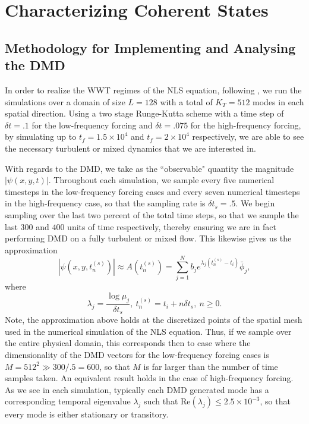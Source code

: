 \documentclass[aps,prl,preprint,groupedaddress]{revtex4-1}
\begin{document}
\section*{Characterizing Coherent States}

\subsection*{Methodology for Implementing and Analysing the DMD}

In order to realize the WWT regimes of the NLS equation, following \cite{nazarenko2}, we run the simulations over a domain of size $L=128$ with a total of $K_{T}=512$ modes in each spatial direction.  Using a two stage Runge-Kutta scheme with a time step of $\delta t=.1$ for the low-frequency forcing and $\delta t=.075$ for the high-frequency forcing, by simulating up to $t_{f}=1.5\times 10^{4}$ and $t_{f}=2\times 10^{4}$ respectively, we are able to see the necessary turbulent or mixed dynamics that we are interested in.  

With regards to the DMD, we take as the ``observable" quantity the magnitude $|\psi(x,y,t)|$.  Throughout each simulation, we sample every five numerical timesteps in the low-frequency forcing cases and every seven numerical timesteps in the high-frequency case, so that the sampling rate is $\delta t_{s}=.5$.  We begin sampling over the last two percent of the total time steps, so that we sample the last $300$ and $400$ units of time respectively, thereby ensuring we are in fact performing DMD on a fully turbulent or mixed flow.  This likewise gives us the approximation
\[
|\psi(x,y,t^{(s)}_{n})| \approx A\left(t^{(s)}_{n}\right) = \sum_{j=1}^{N} b_{j}e^{\lambda_{j}(t^{(s)}_{n}-t_{i})} \bar{\phi}_{j},  
\]
where
\[
\lambda_{j} = \frac{\log \mu_{j}}{\delta t_{s}}, ~ t^{(s)}_{n} = t_{i}  + n\delta t_{s}, ~ n\geq 0.
\]
Note, the approximation above holds at the discretized points of the spatial mesh used in the numerical simulation of the NLS equation.  Thus, if we sample over the entire physical domain, this corresponds then to case where the dimensionality of the DMD vectors for the low-frequency forcing cases is $M = 512^2 \gg 300/.5 = 600$, so that $M$ is far larger than the number of time samples taken.  An equivalent result holds in the case of high-frequency forcing.  As we see in each simulation, typically each DMD generated mode has a corresponding temporal eigenvalue $\lambda_{j}$ such that $\mbox{Re}\left(\lambda_{j}\right)\leq 2.5\times 10^{-3}$, so that every mode is either stationary or transitory.  
\end{document}
